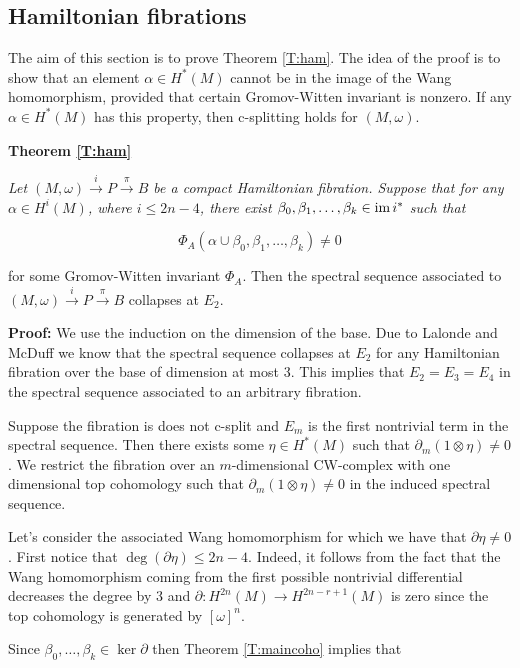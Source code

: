 \documentclass[a4paper,14pt]{article}
\newcommand{\al}{{\alpha}}
\newcommand{\be}{{\beta}}
\newcommand{\om}{{\omega}}
\newcommand{\del}{\partial}
\newcommand{\map}[1]{\stackrel {#1}\longrightarrow}
\newcommand{\Mo}{(M,\omega )}
\newcommand{\im}{\text {im \!}}
\newcommand{\sfib}{\Mo \map{i} P\map{\pi } B}
\newcommand{\pf}{\NI {\bf Proof: }}
\newcommand{\BS}{{\bigskip}}
\newcommand{\NI}{{\noindent}}
\numberwithin{equation}{section}
\begin{document}
\subsection{Hamiltonian fibrations}\label{SS:hf}

The aim of this section is to prove Theorem \ref{T:ham}.
The idea of the proof is to show that
an element $\al \in H^*(M)$ cannot be in the image
of the Wang homomorphism, provided that certain Gromov-Witten
invariant is nonzero. If any $\al \in H^*(M)$ 
has this property, then c-splitting holds for $\Mo $.

\BS

\NI
{\bf Theorem \ref{T:ham}}
{\em
Let $\sfib $ be a compact Hamiltonian fibration. 
Suppose that for any
$\al \in H^i(M)$, where $i \leq 2n -4$,
there exist $\be _0,\be _1,\dots ,\be_k \in \im i^*$ such
that 

$$\Phi _A (\al \cup \be_0,\be_1,\dots,\be_k)\neq 0$$

\NI
for some Gromov-Witten invariant $\Phi _A $.
Then the spectral sequence associated to 
$\sfib $ collapses at $E_2$.
}

\BS

\pf We use the induction on the dimension of the base. 
Due to Lalonde and McDuff \cite{lm} we know that 
the spectral sequence collapses at $E_2$ for any
Hamiltonian fibration over the base of dimension
at most  3. This implies that $E_2=E_3=E_4$ in the 
spectral sequence associated to an arbitrary fibration.


Suppose the fibration is does not c-split and $E_m$ is the
first nontrivial term in the spectral sequence.
Then there exists some $\eta \in H^*(M)$ such that
$\partial _m(1\otimes \eta) \neq 0$. We restrict
the fibration over an $m$-dimensional CW-complex
with one dimensional top cohomology such that
$\partial _m(1\otimes \eta) \neq 0$ in the induced
spectral sequence.

Let's consider
the associated Wang homomorphism for which we have
that $\partial \eta \neq 0$.
First notice that 
$\deg (\partial \eta ) \leq 2n-4$. 
Indeed, it
follows from the fact that 
the Wang homomorphism coming from the first possible nontrivial
differential decreases the degree by 3 and
$\partial :H^{2n}(M)\to H^{2n-r+1}(M)$
is zero since the top cohomology is generated by $[\om ]^n$.


Since $\be _0,\dots , \be _k\in \ker \del$ then
Theorem \ref{T:maincoho} implies that
\end{document}
